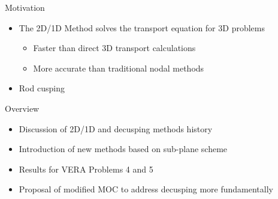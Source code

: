 \begin{frame}[t]{Motivation}

\begin{itemize}
  \item The 2D/1D Method solves the transport equation for 3D problems
  \begin{itemize}
    \item Faster than direct 3D transport calculations
    \item More accurate than traditional nodal methods
  \end{itemize}
  \item Rod cusping
\end{itemize}

\end{frame}


\begin{frame}[t]{Overview}

\begin{itemize}
  \item Discussion of 2D/1D and decusping methods history
  \item Introduction of new methods based on sub-plane scheme
  \item Results for VERA Problems 4 and 5
  \item Proposal of modified MOC to address decusping more fundamentally
\end{itemize}

\end{frame}

